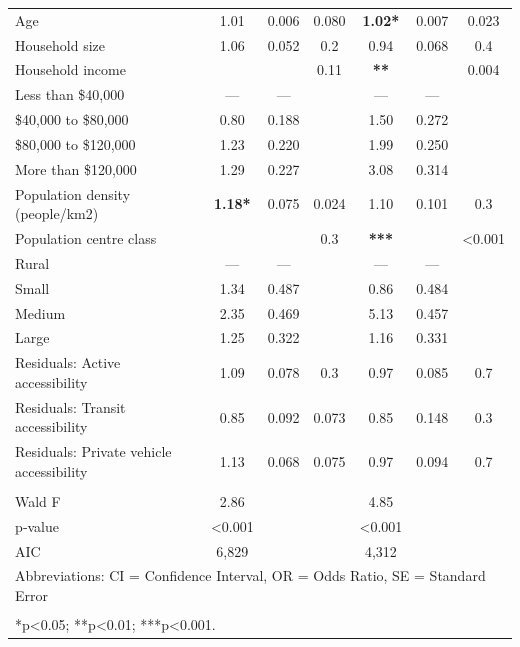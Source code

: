 \documentclass[preprint, 3p,
authoryear]{elsarticle} %
\providecommand{\DIFaddendFL}{} %
\DeclareRobustCommand{\DIFaddendFL}{\DIFOaddendFL \let\includegraphics\DIFOincludegraphics} %
\begin{document}
\begin{table}
\begin{tabular}[t]{lcccccc}
Age & 1.01 & 0.006 & 0.080 & \textbf{1.02*} & 0.007 & 0.023\\
\addlinespace
Household size & 1.06 & 0.052 & 0.2 & 0.94 & 0.068 & 0.4\\
Household income &  &  & 0.11 & \textbf{**} &  & 0.004\\
\hspace{1em}Less than \$40,000 & — & — &  & — & — & \\
\hspace{1em}\$40,000 to \$80,000 & 0.80 & 0.188 &  & 1.50 & 0.272 & \\
\hspace{1em}\$80,000 to \$120,000 & 1.23 & 0.220 &  & 1.99 & 0.250 & \\
\addlinespace
\hspace{1em}More than \$120,000 & 1.29 & 0.227 &  & 3.08 & 0.314 & \\
Population density (people/km2) & \textbf{1.18*} & 0.075 & 0.024 & 1.10 & 0.101 & 0.3\\
Population centre class &  &  & 0.3 & \textbf{***} &  & <0.001\\
\hspace{1em}Rural & — & — &  & — & — & \\
\hspace{1em}Small & 1.34 & 0.487 &  & 0.86 & 0.484 & \\
\addlinespace
\hspace{1em}Medium & 2.35 & 0.469 &  & 5.13 & 0.457 & \\
\hspace{1em}Large & 1.25 & 0.322 &  & 1.16 & 0.331 & \\
Residuals: Active accessibility & 1.09 & 0.078 & 0.3 & 0.97 & 0.085 & 0.7\\
Residuals: Transit accessibility & 0.85 & 0.092 & 0.073 & 0.85 & 0.148 & 0.3\\
Residuals: Private vehicle accessibility & 1.13 & 0.068 & 0.075 & 0.97 & 0.094 & 0.7\\
\midrule\\
\addlinespace
Wald F & 2.86 &  &  & 4.85 &  & \\
p‑value & <0.001 &  &  & <0.001 &  & \\
AIC & 6,829 &  &  & 4,312 &  & \\
\bottomrule
\multicolumn{7}{l}{\rule{0pt}{1em}Abbreviations: CI = Confidence Interval, OR = Odds Ratio, SE = Standard Error}\\
\multicolumn{7}{l}{\textsuperscript{} *p<0.05; **p<0.01; ***p<0.001.}\\
\end{tabular}
\DIFaddendFL \end{table}
\end{document}
